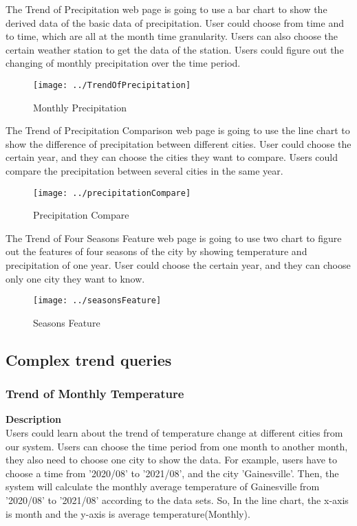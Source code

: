 \documentclass[]{article}
\begin{document}
	\noindent The Trend of Precipitation web page is going to use a bar chart to show the derived data of the basic data of precipitation. User could choose from time and to time, which are all at the month time granularity. Users can also choose the certain weather station to get the data of the station. Users could figure out the changing of monthly precipitation over the time period.
	\begin{figure}[H]
		\centering
		\texttt{[image: ../TrendOfPrecipitation]}
		\caption{Monthly Precipitation}
		\label{fig:trendofprecipitation}
	\end{figure}
	
	\noindent The Trend of Precipitation Comparison web page is going to use the line chart to show the difference of precipitation between different cities. User could choose the certain year, and they can choose the cities they want to compare. Users could compare the precipitation between several cities in the same year.
	\begin{figure}[H]
		\centering
		\texttt{[image: ../precipitationCompare]}
		\caption{Precipitation Compare}
		\label{fig:precipitationcompare}
	\end{figure}
	
	\noindent The Trend of Four Seasons Feature web page is going to use two chart to figure out the features of four seasons of the city by showing temperature and precipitation of one year. User could choose the certain year, and they can choose only one city they want to know.
	\begin{figure}[H]
		\centering
		\texttt{[image: ../seasonsFeature]}
		\caption{Seasons Feature}
		\label{fig:seasonsfeature}
	\end{figure}
	

	\subsection{Complex trend queries}
	
	\subsubsection{Trend of Monthly Temperature}
	
	\textbf{Description}  \\
	\noindent Users could learn about the trend of temperature change at different cities from our system. Users can choose the time period from one month to another month, they also need to choose one city to show the data. For example, users have to choose a time from '2020/08' to '2021/08', and the city 'Gainesville'. Then, the system will calculate the monthly average temperature of Gainesville from '2020/08' to '2021/08' according to the data sets. So, In the line chart, the x-axis is month and the y-axis is average temperature(Monthly).    \\
	
\end{document}
